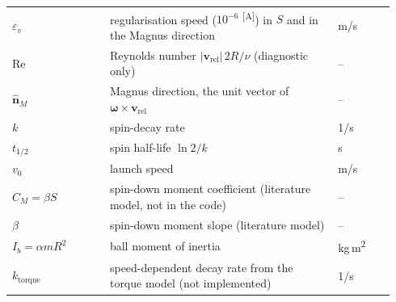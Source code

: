 \documentclass[11pt]{article}
\makeatletter
\DeclareRobustCommand{\provtag}[1]{%
  \ifmmode\text{\provtag@text{#1}}\else\provtag@text{#1}\fi}
\newcommand{\provtag@text}[1]{%
  \textsuperscript{\textsf{\upshape\scriptsize\color@grey[#1]}}}
\newcommand{\color@grey}[1]{#1}
\newcommand{\color@grey}[1]{\pdfliteral{0.45 g}#1\pdfliteral{0 g}}
\DeclareRobustCommand{\assumed}{\provtag{A}}
\newcommand{\vect}[1]{\bm{#1}}
\makeatother
\begin{document}
\begin{table}[p]
\begin{tabular}{@{}p{0.24\linewidth}p{0.56\linewidth}p{0.14\linewidth}@{}}
  $\varepsilon_v$ & regularisation speed ($10^{-6}$\assumed) in $S$ and in the Magnus direction & m/s \\
  $\mathrm{Re}$ & Reynolds number $|\vect{v}_{\mathrm{rel}}|\,2R/\nu$ (diagnostic only) & -- \\
  $\hat{\vect{n}}_M$ & Magnus direction, the unit vector of $\vect{\omega}\times\vect{v}_{\mathrm{rel}}$ & -- \\
  $k$ & spin-decay rate & 1/s \\
  $t_{1/2}$ & spin half-life $\ln2/k$ & s \\
  $v_0$ & launch speed & m/s \\
  $C_M=\beta S$ & spin-down moment coefficient (literature model, not in the code) & -- \\
  $\beta$ & spin-down moment slope (literature model) & -- \\
  $I_b=\alpha mR^2$ & ball moment of inertia & kg\,m\textsuperscript{2} \\
  $k_{\mathrm{torque}}$ & speed-dependent decay rate from the torque model (not implemented) & 1/s \\
  \bottomrule
\end{tabular}
\end{table}
\end{document}
